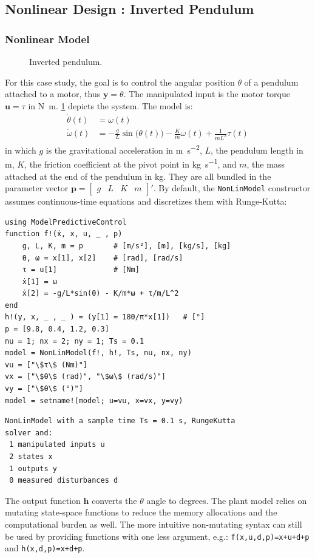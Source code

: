 \subsection{Nonlinear Design : Inverted Pendulum}
\label{sec.nonlinear_design}

\subsubsection{Nonlinear Model}

\begin{figure}[ht]
    \centering
    
    \caption{Inverted pendulum.}\label{fig:pendulum}
\end{figure}

For this case study, the goal is to control the angular position $\theta$ of a pendulum attached to a motor, thus $\mathbf{y} = \theta$. The manipulated input is the motor torque $\mathbf{u} = \tau$ in \si{\newton\meter}. \cref{fig:pendulum} depicts the system. The model is:
\begin{align}
\dot{\theta}(t) &= \omega(t) \\
\dot{\omega}(t) &= -\frac{g}{L}\sin\big(\theta(t)\big) -\frac{K}{m}\omega(t) + \frac{1}{m L^2}\tau(t) \label{eq.pendulum_speed}
\end{align}
in which $g$ is the gravitational acceleration in \si{\meter\per\second\squared}, $L$, the pendulum length in \si{\meter}, $K$, the friction coefficient at the pivot point in \si{\kilogram\per\second}, and $m$, the mass attached at the end of the pendulum in \si{\kilogram}. They are all bundled in the parameter vector $\mathbf{p}=[\begin{smallmatrix}g & L & K & m\end{smallmatrix}]'$. By default, the \texttt{NonLinModel} constructor assumes continuous-time equations and discretizes them with Runge-Kutta:
\begin{verbatim}
using ModelPredictiveControl
function f!(ẋ, x, u, _ , p)
    g, L, K, m = p       # [m/s²], [m], [kg/s], [kg]
    θ, ω = x[1], x[2]    # [rad], [rad/s]
    τ = u[1]             # [Nm]
    ẋ[1] = ω
    ẋ[2] = -g/L*sin(θ) - K/m*ω + τ/m/L^2
end
h!(y, x, _ , _ ) = (y[1] = 180/π*x[1])   # [°]
p = [9.8, 0.4, 1.2, 0.3]
nu = 1; nx = 2; ny = 1; Ts = 0.1
model = NonLinModel(f!, h!, Ts, nu, nx, ny)
vu = ["\$τ\$ (Nm)"]
vx = ["\$θ\$ (rad)", "\$ω\$ (rad/s)"]
vy = ["\$θ\$ (°)"]
model = setname!(model; u=vu, x=vx, y=vy)
\end{verbatim}
\spacerepl
\begin{verbatim}
NonLinModel with a sample time Ts = 0.1 s, RungeKutta
solver and:
 1 manipulated inputs u
 2 states x
 1 outputs y
 0 measured disturbances d
\end{verbatim}
The output function $\mathbf{h}$ converts the $\theta$ angle to degrees. The plant model relies on mutating state-space functions to reduce the memory allocations and the computational burden as well. The more intuitive non-mutating syntax can still be used by providing functions with one less argument, e.g.: \texttt{f(x,u,d,p)=x+u+d+p} and \texttt{h(x,d,p)=x+d+p}.

